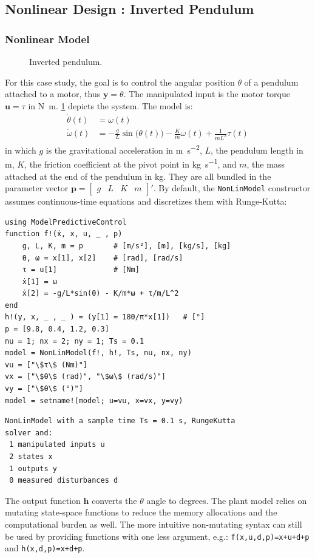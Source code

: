 \subsection{Nonlinear Design : Inverted Pendulum}
\label{sec.nonlinear_design}

\subsubsection{Nonlinear Model}

\begin{figure}[ht]
    \centering
    
    \caption{Inverted pendulum.}\label{fig:pendulum}
\end{figure}

For this case study, the goal is to control the angular position $\theta$ of a pendulum attached to a motor, thus $\mathbf{y} = \theta$. The manipulated input is the motor torque $\mathbf{u} = \tau$ in \si{\newton\meter}. \cref{fig:pendulum} depicts the system. The model is:
\begin{align}
\dot{\theta}(t) &= \omega(t) \\
\dot{\omega}(t) &= -\frac{g}{L}\sin\big(\theta(t)\big) -\frac{K}{m}\omega(t) + \frac{1}{m L^2}\tau(t) \label{eq.pendulum_speed}
\end{align}
in which $g$ is the gravitational acceleration in \si{\meter\per\second\squared}, $L$, the pendulum length in \si{\meter}, $K$, the friction coefficient at the pivot point in \si{\kilogram\per\second}, and $m$, the mass attached at the end of the pendulum in \si{\kilogram}. They are all bundled in the parameter vector $\mathbf{p}=[\begin{smallmatrix}g & L & K & m\end{smallmatrix}]'$. By default, the \texttt{NonLinModel} constructor assumes continuous-time equations and discretizes them with Runge-Kutta:
\begin{verbatim}
using ModelPredictiveControl
function f!(ẋ, x, u, _ , p)
    g, L, K, m = p       # [m/s²], [m], [kg/s], [kg]
    θ, ω = x[1], x[2]    # [rad], [rad/s]
    τ = u[1]             # [Nm]
    ẋ[1] = ω
    ẋ[2] = -g/L*sin(θ) - K/m*ω + τ/m/L^2
end
h!(y, x, _ , _ ) = (y[1] = 180/π*x[1])   # [°]
p = [9.8, 0.4, 1.2, 0.3]
nu = 1; nx = 2; ny = 1; Ts = 0.1
model = NonLinModel(f!, h!, Ts, nu, nx, ny)
vu = ["\$τ\$ (Nm)"]
vx = ["\$θ\$ (rad)", "\$ω\$ (rad/s)"]
vy = ["\$θ\$ (°)"]
model = setname!(model; u=vu, x=vx, y=vy)
\end{verbatim}
\spacerepl
\begin{verbatim}
NonLinModel with a sample time Ts = 0.1 s, RungeKutta
solver and:
 1 manipulated inputs u
 2 states x
 1 outputs y
 0 measured disturbances d
\end{verbatim}
The output function $\mathbf{h}$ converts the $\theta$ angle to degrees. The plant model relies on mutating state-space functions to reduce the memory allocations and the computational burden as well. The more intuitive non-mutating syntax can still be used by providing functions with one less argument, e.g.: \texttt{f(x,u,d,p)=x+u+d+p} and \texttt{h(x,d,p)=x+d+p}.

